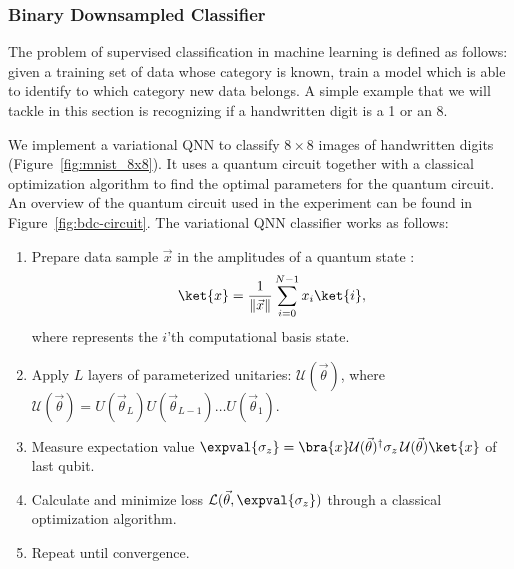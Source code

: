 \documentclass[a4paper,10pt]{article}
\begin{document}
\subsubsection{Binary Downsampled Classifier} \label{sec:bdc}
The problem of supervised classification in machine learning is defined as follows: given a training set of data whose category is known, train a model which is able to identify to which category new data belongs.
A simple example that we will tackle in this section is recognizing if a handwritten digit is a 1 or an 8.

We implement a variational QNN to classify $8 \times 8$ images of handwritten digits (Figure~\ref{fig:mnist_8x8}).
It uses a quantum circuit together with a classical optimization algorithm to find the optimal parameters for the quantum circuit.
An overview of the quantum circuit used in the experiment can be found in Figure~\ref{fig:bdc-circuit}.
The variational QNN classifier works as follows:
\begin{enumerate}
	\item Prepare data sample $\vec{x}$ in the amplitudes of a quantum state :
	\begin{equation}
	 \ket{x} = \dfrac{1}{\lVert\vec{x}\rVert}\sum_{i=0}^{N-1} x_i\ket{i},
	\end{equation}
	where  represents the $i$'th computational basis state.
	\item Apply $L$ layers of parameterized unitaries: $\mathcal{U}(\vec{\theta})$, where $\mathcal{U}(\vec{\theta}) = U(\vec{\theta}_L) U(\vec{\theta}_{L-1}) \ldots U(\vec{\theta}_1)$.
	\item Measure expectation value $\expval{\sigma_z} = \bra{x}\mathcal{U}(\vec{\theta})^\dagger \sigma_z\, \mathcal{U}(\vec{\theta})\ket{x}$ of last qubit.
	\item Calculate and minimize loss $\mathcal{L}(\vec{\theta}, \expval{\sigma_z})$ through a classical optimization algorithm.
	\item Repeat until convergence.
\end{enumerate}
\end{document}
